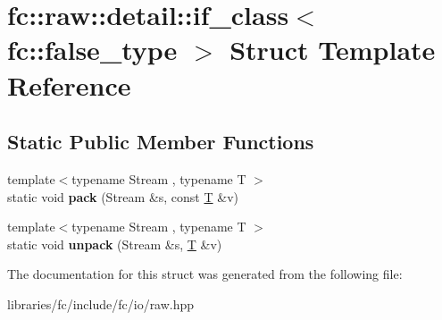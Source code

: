 \hypertarget{structfc_1_1raw_1_1detail_1_1if__class_3_01fc_1_1false__type_01_4}{}\section{fc\+:\+:raw\+:\+:detail\+:\+:if\+\_\+class$<$ fc\+:\+:false\+\_\+type $>$ Struct Template Reference}
\label{structfc_1_1raw_1_1detail_1_1if__class_3_01fc_1_1false__type_01_4}
\subsection*{Static Public Member Functions}
\begin{DoxyCompactItemize}
\item 
\mbox{\label{structfc_1_1raw_1_1detail_1_1if__class_3_01fc_1_1false__type_01_4_afa2287dd623f07b0507001c18862bc95}} 
{\footnotesize template$<$typename Stream , typename T $>$ }\\static void {\bfseries pack} (Stream \&s, const \mbox{\hyperlink{struct_t}{T}} \&v)
\item 
\mbox{\label{structfc_1_1raw_1_1detail_1_1if__class_3_01fc_1_1false__type_01_4_a5f130ef2d251c9abbf6b2f8c2d136423}} 
{\footnotesize template$<$typename Stream , typename T $>$ }\\static void {\bfseries unpack} (Stream \&s, \mbox{\hyperlink{struct_t}{T}} \&v)
\end{DoxyCompactItemize}


The documentation for this struct was generated from the following file\+:\begin{DoxyCompactItemize}
\item 
libraries/fc/include/fc/io/raw.\+hpp\end{DoxyCompactItemize}
